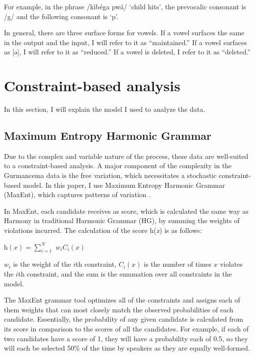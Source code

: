\documentclass[output=paper,newtxmath,modfonts,nonflat,draftmode]{langsci/langscibook}
\begin{document}
For example, in the phrase /kìbéga pwá/ `child hits', the prevocalic consonant is /g/ and the following consonant is `p'. 

In general, there are three surface forms for vowels. If a vowel surfaces the same in the output and the input, I will refer to it as ``maintained.'' If a vowel surfaces as [ə], I will refer to it as ``reduced.'' If a vowel is deleted, I refer to it as ``deleted.''

\section{Constraint-based analysis}\label{sec:baird:5}
In this section, I will explain the model I used to analyze the data. 

\subsection{Maximum Entropy Harmonic Grammar}\largerpage

Due to the complex and variable nature of the process, these data are well-suited to a constraint-based analysis. A major component of the complexity in the Gurmancema data is the free variation, which necessitates a stochastic constraint-based model. In this paper, I use Maximum Entropy Harmonic Grammar (MaxEnt), which captures patterns of variation \citep{GoldwaterJohnson2003,HayesWilson2008}. 
	 
In MaxEnt, each candidate receives as score, which is calculated the same way as Harmony in traditional Harmonic Grammar (HG), by summing the weights of violations incurred. The calculation of the score h(\textit{x}) is as follows: 

\ea
$ \mathrm{h}(x) = \sum_{\textit{i}=1}^{\textit{N}}$ ${w_i}{C_i}(x)$
\z

${w_i}$ is the weight of the $i$th constraint, ${C_i}(x)$ is the number of times $x$ violates the $i$th constraint, and the sum is the summation over all constraints in the model.  

The MaxEnt grammar tool \citep{WilsonHayesGeorge08} optimizes all of the constraints and assigns each of them weights that can most closely match the observed probabilities of each candidate. Essentially, the probability of any given candidate is calculated from its score in comparison to the scores of all the candidates. For example, if each of two candidates have a score of 1, they will have a probability each of 0.5, so they will each be selected 50\% of the time by speakers as they are equally well-formed.
\end{document}
